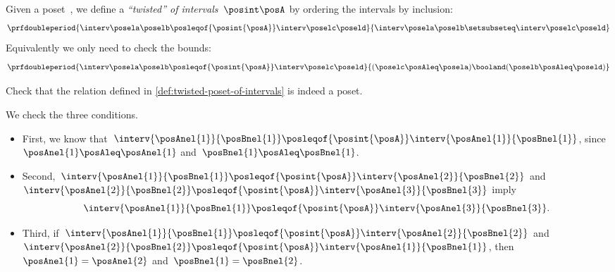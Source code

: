 \begin{marginfigure}
    \centering
    \caption{
        $\interv \posela \poselb
            \posleqof{\posint{\posA}}
            \interv \poselc \poseld$
    }
\end{marginfigure}

\begin{definition}
    \label{def:twisted-poset-of-intervals}
    Given a poset~\posA, we define a \emph{``twisted''  of intervals}~$\posint\posA$
    by ordering the intervals by inclusion:
    \begin{equation}\label{eq:twisted-1}
        \prfdoubleperiod{
            \interv \posela \poselb
            \posleqof{\posint{\posA}}
            \interv \poselc \poseld
        }{
            \interv \posela \poselb
            \setsubseteq
            \interv \poselc \poseld
        }
    \end{equation}
    Equivalently we only need to check the bounds:
    \begin{equation}\label{eq:twisted-2}
        \prfdoubleperiod{
            \interv \posela \poselb
            \posleqof{\posint{\posA}}
            \interv \poselc \poseld
        }{
            (\poselc \posAleq \posela ) \booland (\poselb \posAleq \poseld)
        }
    \end{equation}

\end{definition}

\begin{exercise}
    Check that the relation defined in \cref{def:twisted-poset-of-intervals} is indeed a poset.
\end{exercise}
\begin{solution}
    We check the three conditions.
    \begin{itemize}
        \item First, we know that~$\interv{\posAnel{1}}{\posBnel{1}}\posleqof{\posint{\posA}}\interv{\posAnel{1}}{\posBnel{1}}$, since~$\posAnel{1}\posAleq \posAnel{1}$ and~$\posBnel{1}\posAleq \posBnel{1}$.
        \item Second,~$\interv{\posAnel{1}}{\posBnel{1}}\posleqof{\posint{\posA}}\interv{\posAnel{2}}{\posBnel{2}}$ and~$\interv{\posAnel{2}}{\posBnel{2}}\posleqof{\posint{\posA}}\interv{\posAnel{3}}{\posBnel{3}}$ imply
              \begin{equation}
                  \interv{\posAnel{1}}{\posBnel{1}}\posleqof{\posint{\posA}}\interv{\posAnel{3}}{\posBnel{3}}.
              \end{equation}
        \item Third, if~$\interv{\posAnel{1}}{\posBnel{1}}\posleqof{\posint{\posA}}\interv{\posAnel{2}}{\posBnel{2}}$ and~$\interv{\posAnel{2}}{\posBnel{2}}\posleqof{\posint{\posA}}\interv{\posAnel{1}}{\posBnel{1}}$, then~$\posAnel{1}=\posAnel{2}$ and~$\posBnel{1}=\posBnel{2}$.
    \end{itemize}
\end{solution}

